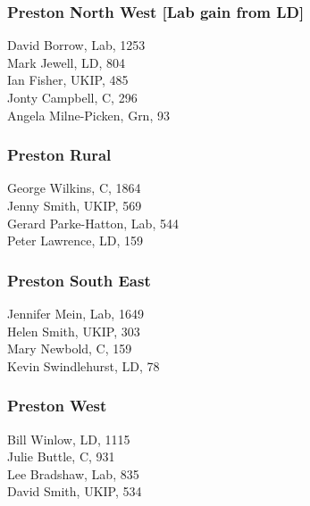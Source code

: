 \documentclass[a4paper,openany,10pt]{book}
\begin{document}
\subsubsection*{Preston North West \hspace*{\fill}\nolinebreak[1]%
\enspace\hspace*{\fill}
[Lab gain from LD]}



David Borrow, Lab, 1253\\
Mark Jewell, LD, 804\\
Ian Fisher, UKIP, 485\\
Jonty Campbell, C, 296\\
Angela Milne-Picken, Grn, 93\\


\subsubsection*{Preston Rural}



George Wilkins, C, 1864\\
Jenny Smith, UKIP, 569\\
Gerard Parke-Hatton, Lab, 544\\
Peter Lawrence, LD, 159\\


\subsubsection*{Preston South East}



Jennifer Mein, Lab, 1649\\
Helen Smith, UKIP, 303\\
Mary Newbold, C, 159\\
Kevin Swindlehurst, LD, 78\\


\subsubsection*{Preston West}



Bill Winlow, LD, 1115\\
Julie Buttle, C, 931\\
Lee Bradshaw, Lab, 835\\
David Smith, UKIP, 534\\
\end{document}
